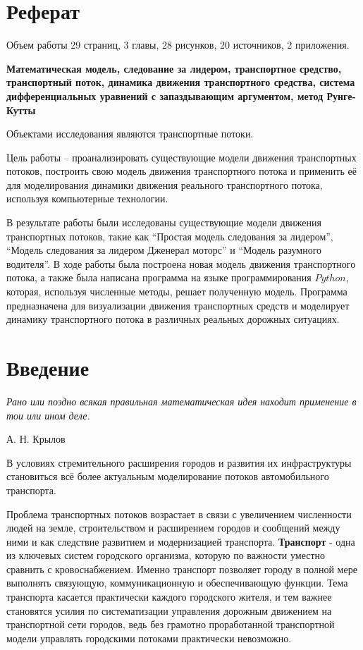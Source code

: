 \documentclass[12pt, a4paper]{extarticle}
\numberwithin{equation}{section}
\numberwithin{figure}{section}
\begin{document}
\justify 
\setlength{\parindent}{1.25cm} 
\newpage 
\thispagestyle{empty} 

\section*{Реферат}
\vspace{\baselineskip}	
Объем работы 29 страниц, 3 главы, 28 рисунков, 20 источников, 2 приложения.

\textbf{Математическая модель, следование за лидером, транспортное средство, транспортный поток, динамика движения транспортного средства, система дифференциальных уравнений с запаздывающим аргументом, метод Рунге-Кутты}

Объектами исследования являются транспортные потоки.

Цель работы – проанализировать существующие модели движения транспортных потоков, построить свою модель движения транспортного потока и применить её для моделирования динамики движения реального транспортного потока, используя компьютерные технологии.                                          

В результате работы были исследованы существующие модели движения транспортных потоков, такие как ``Простая модель следования за лидером'', ``Модель следования за лидером Дженерал моторс'' и ``Модель разумного водителя''. В ходе работы была построена новая модель движения транспортного потока, а также была написана программа на языке программирования $Python$, которая, используя численные методы, решает полученную модель. Программа предназначена для визуализации движения транспортных средств и моделирует динамику транспортного потока в различных реальных дорожных ситуациях.

\newpage

\setcounter{page}{2}

\tableofcontents 
\newpage 

\section*{Введение}
\epigraph{\textit{Рано или поздно всякая правильная математическая идея находит применение в тои или ином деле.}}
{А. Н. Крылов}
В условиях стремительного расширения городов и развития их инфраструктуры становиться всё более актуальным моделирование потоков автомобильного транспорта. 

Проблема транспортных потоков возрастает в связи с увеличением численности людей на земле, строительством и расширением городов и сообщений между ними и как следствие развитием и модернизацией транспорта.  \textbf{Транспорт} - одна из ключевых систем городского организма, которую по важности уместно сравнить с кровоснабжением. Именно транспорт позволяет городу в полной мере выполнять связующую, коммуникационную и обеспечивающую функции. Тема транспорта касается практически каждого городского жителя, и тем важнее становятся усилия по систематизации управления дорожным движением на транспортной сети городов, ведь без грамотно проработанной транспортной модели управлять городскими потоками практически невозможно. 
\end{document}
